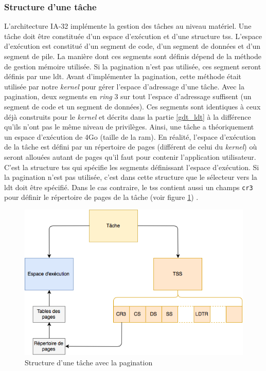 \subsubsection{Structure d'une tâche}
L'architecture \acrshort{IA-32} implémente la gestion des tâches au niveau matériel.
Une tâche doit être constituée d'un espace d'exécution et d'une structure \acrshort{tss}.
L'espace d'exécution est constitué d'un segment de code, d'un segment de données
et d'un segment de pile. La manière dont ces segments sont définis dépend de la
méthode de gestion mémoire utilisée. Si la pagination n'est pas utilisée, ces segment
seront définis par une \acrshort{ldt}. Avant d'implémenter la pagination, cette
méthode était utilisée par notre \textit{kernel} pour gérer l'espace d'adressage
d'une tâche. Avec la pagination, deux segments en \textit{ring} 3 sur tout l'espace
d'adressage suffisent (un segment de code et un segment de données). Ces segments
sont identiques à ceux déjà construits pour le \textit{kernel} et décrits dans
la partie \ref{gdt_ldt} à la différence qu'ils n'ont pas le même niveau de privilèges.
Ainsi, une tâche a théoriquement un espace d'exécution de 4Go (taille de la \acrshort{ram}).
En réalité, l'espace d'exécution de la tâche est défini par un répertoire de pages
(différent de celui du \textit{kernel}) où seront allouées autant de pages qu'il faut
pour contenir l'application utilisateur. C'est la structure \acrshort{tss} qui spécifie
les segments définissant l'espace d'exécution. Si la pagination n'est pas utilisée,
c'est dans cette structure que le sélecteur vers la \acrshort{ldt} doit être spécifié.
Dans le cas contraire, le \acrshort{tss} contient aussi un champs \texttt{cr3}
pour définir le répertoire de pages de la tâche (voir figure \ref{task_exec_space})
\cite{ref66}.

\begin{figure}[!h]
  \centering
  \includegraphics[scale=.7]{images/task_exec_space.png}
  \caption{Structure d'une tâche avec la pagination}
  \label{task_exec_space}
\end{figure}

